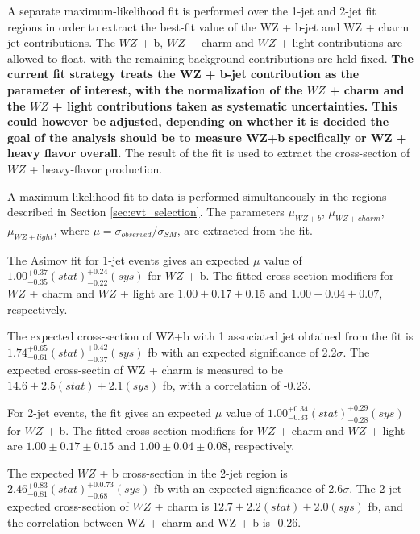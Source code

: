 
A separate maximum-likelihood fit is performed over the 1-jet and 2-jet fit regions in order to extract the best-fit value of the WZ + b-jet and WZ + charm jet contributions. The $WZ$ + b, $WZ$ + charm and $WZ$ + light contributions are allowed to float, with the remaining background contributions are held fixed. \textbf{The current fit strategy treats the WZ + b-jet contribution as the parameter of interest, with the normalization of the $WZ$ + charm and the $WZ$ + light contributions taken as systematic uncertainties. This could however be adjusted, depending on whether it is decided the goal of the analysis should be to measure WZ+b specifically or WZ + heavy flavor overall.} The result of the fit is used to extract the cross-section of $WZ$ + heavy-flavor production.

A maximum likelihood fit to data is performed simultaneously in the regions described in Section \ref{sec:evt_selection}. The parameters $\mu_{WZ+b}$, $\mu_{WZ+charm}$, $\mu_{WZ+light}$, where $\mu = \sigma_{observed}/\sigma_{SM} $, are extracted from the fit.


The Asimov fit for 1-jet events gives an expected $\mu$ value of $1.00^{+0.37}_{-0.35}(stat)^{+0.24}_{-0.22}(sys)$ for $WZ$ + b. The fitted cross-section modifiers for $WZ$ + charm and $WZ$ + light are $1.00 \pm 0.17 \pm 0.15$ and $1.00 \pm 0.04 \pm 0.07 $, respectively.

The expected cross-section of WZ+b with 1 associated jet obtained from the fit is $1.74^{+0.65}_{-0.61}(stat)^{+0.42}_{-0.37}(sys)$ fb with an expected significance of 2.2$\sigma$. The expected cross-sectin of WZ + charm is measured to be $14.6 \pm 2.5 (stat) \pm 2.1 (sys)$ fb, with a correlation of -0.23. 


For 2-jet events, the fit gives an expected $\mu$ value of $1.00^{+0.34}_{-0.33}(stat)^{+0.29}_{-0.28}(sys)$ for $WZ$ + b. The fitted cross-section modifiers for $WZ$ + charm and $WZ$ + light are $1.00 \pm 0.17 \pm 0.15$ and $1.00 \pm 0.04 \pm 0.08 $, respectively.

The expected $WZ$ + b cross-section in the 2-jet region is $2.46^{+0.83}_{-0.81}(stat)^{+0.0.73}_{-0.68}(sys)$ fb with an expected significance of 2.6$\sigma$. The 2-jet expected cross-section of $WZ$ + charm is $12.7 \pm 2.2 (stat) \pm 2.0 (sys)$ fb, and the correlation between WZ + charm and WZ + b is -0.26. 

